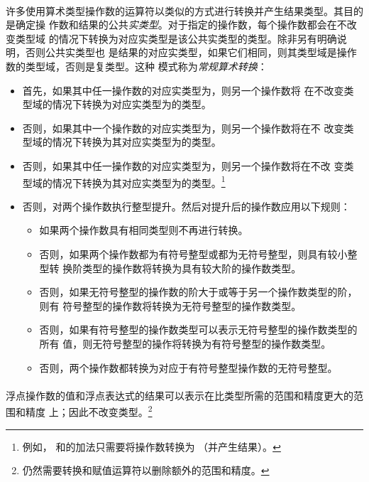 {\paragraph{}
许多使用算术类型操作数的运算符以类似的方式进行转换并产生结果类型。其目的是确定操
作数和结果的公共\textit{实类型}。对于指定的操作数，每个操作数都会在不改变类型域
的情况下转换为对应实类型是该公共实类型的类型。除非另有明确说明，否则公共实类型也
是结果的对应实类型，如果它们相同，则其类型域是操作数的类型域，否则是复类型。这种
模式称为\textit{常规算术转换}：
\begin{itemize}
  \item{首先，如果其中任一操作数的对应实类型为，则另一个操作数将
    在不改变类型域的情况下转换为对应实类型为的类型。}
  \item{否则，如果其中一个操作数的对应实类型为，则另一个操作数将在不
    改变类型域的情况下转换为其对应实类型为的类型。}
  \item{否则，如果其中任一操作数的对应实类型为，则另一个操作数将在不改
    变类型域的情况下转换为其对应实类型为的类型。\footnote{例如，
    和的加法只需要将操作数转换为
    （并产生结果）。}}
  \item{否则，对两个操作数执行整型提升。然后对提升后的操作数应用以下规则：
    \begin{itemize}
      \item{如果两个操作数具有相同类型则不再进行转换。}
      \item{否则，如果两个操作数都为有符号整型或都为无符号整型，则具有较小整型转
        换阶类型的操作数将转换为具有较大阶的操作数类型。}
      \item{否则，如果无符号整型的操作数的阶大于或等于另一个操作数类型的阶，则有
        符号整型的操作数将转换为无符号整型的操作数类型。}
      \item{否则，如果有符号整型的操作数类型可以表示无符号整型的操作数类型的所有
        值，则无符号整型的操作将转换为有符号整型的操作数类型。}
      \item{否则，两个操作数都转换为对应于有符号整型操作数的无符号整型。}
    \end{itemize}}
\end{itemize}

\paragraph{}
浮点操作数的值和浮点表达式的结果可以表示在比类型所需的范围和精度更大的范围和精度
上；因此不改变类型。\footnote{仍然需要转换和赋值运算符以删除额外的范围和精度。}

}
